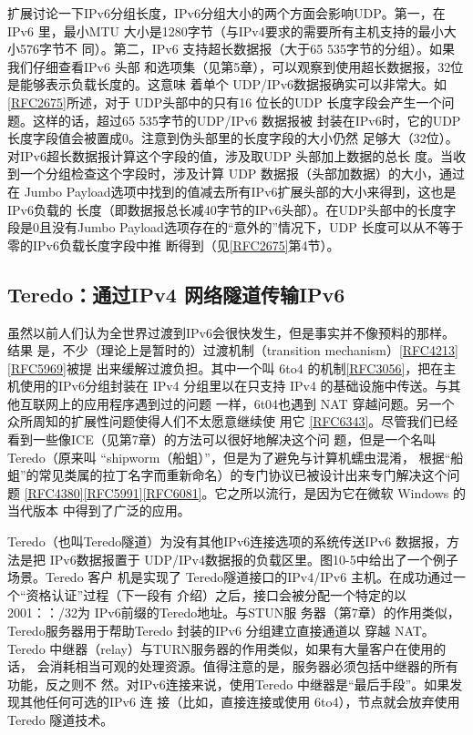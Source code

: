 扩展讨论一下IPv6分组长度，IPv6分组大小的两个方面会影响UDP。第一，在IPv6
里，最小MTU 大小是1280字节（与IPv4要求的需要所有主机支持的最小大小576字节不
同）。第二，IPv6 支持超长数据报（大于65 535字节的分组）。如果我们仔细查看IPv6 头部
和选项集（见第5章），可以观察到使用超长数据报，32位是能够表示负载长度的。这意味
着单个
UDP/IPv6数据报确实可以非常大。如\href{https://www.rfc-editor.org/rfc/rfc2675}{[RFC2675]}所述，对于
UDP头部中的只有16
位长的UDP 长度字段会产生一个问题。这样的话，超过65 535字节的UDP/IPv6 数据报被
封装在IPv6时，它的UDP 长度字段值会被置成0。注意到伪头部里的长度字段的大小仍然
足够大（32位）。对IPv6超长数据报计算这个字段的值，涉及取UDP 头部加上数据的总长
度。当收到一个分组检查这个字段时，涉及计算 UDP 数据报（头部加数据）的大小，通过在
Jumbo Payload选项中找到的值减去所有IPv6扩展头部的大小来得到，这也是IPv6负载的
长度（即数据报总长减40字节的IPv6头部）。在UDP头部中的长度字段是0且没有Jumbo
Payload选项存在的“意外的”情况下，UDP 长度可以从不等于零的IPv6负载长度字段中推
断得到（见\href{https://www.rfc-editor.org/rfc/rfc2675}{[RFC2675]}第4节）。

\subsection{Teredo：通过IPv4 网络隧道传输IPv6}
虽然以前人们认为全世界过渡到IPv6会很快发生，但是事实并不像预料的那样。结果
是，不少（理论上是暂时的）过渡机制（transition
mechanism）\href{https://www.rfc-editor.org/rfc/rfc4213}{[RFC4213]}\href{https://www.rfc-editor.org/rfc/rfc5969}{[RFC5969]}被提
出来缓解过渡负担。其中一个叫 6to4
的机制\href{https://www.rfc-editor.org/rfc/rfc3056}{[RFC3056]}，把在主机使用的IPv6分组封装在
IPv4 分组里以在只支持 IPv4 的基础设施中传送。与其他互联网上的应用程序遇到过的问题
一样，6t04也遇到 NAT 穿越问题。另一个众所周知的扩展性问题使得人们不太愿意继续使
用它
\href{https://www.rfc-editor.org/rfc/rfc6343}{[RFC6343]}。尽管我们已经看到一些像ICE（见第7章）的方法可以很好地解决这个问
题，但是一个名叫 Teredo（原来叫 “shipworm（船蛆）”，但是为了避免与计算机蠕虫混淆，
根据“船蛆”的常见类属的拉丁名字而重新命名）的专门协议已被设计出来专门解决这个问
题
\href{https://www.rfc-editor.org/rfc/rfc4380}{[RFC4380]}\href{https://www.rfc-editor.org/rfc/rfc5991}{[RFC5991]}\href{https://www.rfc-editor.org/rfc/rfc6081}{[RFC6081]}。它之所以流行，是因为它在微软
Windows 的当代版本
中得到了广泛的应用。

Teredo（也叫Teredo隧道）为没有其他IPv6连接选项的系统传送IPv6 数据报，方法是把
IPv6数据报置于 UDP/IPv4数据报的负载区里。图10-5中给出了一个例子场景。Teredo 客户
机是实现了 Teredo隧道接口的IPv4/IPv6 主机。在成功通过一个“资格认证”过程（下一段有
介绍）之后，接口会被分配一个特定的以2001：：/32为 IPv6前缀的Teredo地址。与STUN服
务器（第7章）的作用类似，Teredo服务器用于帮助Teredo 封装的IPv6 分组建立直接通道以
穿越 NAT。Teredo 中继器（relay）与TURN服务器的作用类似，如果有大量客户在使用的话，
会消耗相当可观的处理资源。值得注意的是，服务器必须包括中继器的所有功能，反之则不
然。对IPv6连接来说，使用Teredo 中继器是“最后手段”。如果发现其他任何可选的IPv6 连
接（比如，直接连接或使用 6to4），节点就会放弃使用 Teredo 隧道技术。

